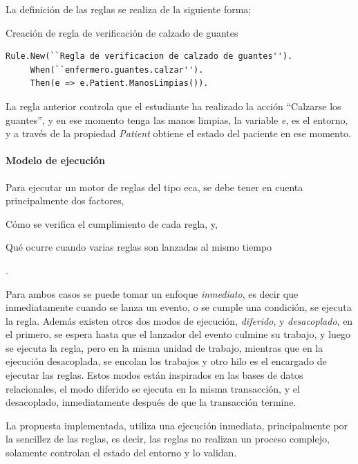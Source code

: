 La definición de las reglas se realiza de la siguiente forma;
\begin{algorithm}[H]
\caption{Creación de regla de verificación de calzado de guantes}
\label{alg:rule:guante}
\lstset{style=sharpc}
\begin{lstlisting}
Rule.New(``Regla de verificacion de calzado de guantes'').
     When(``enfermero.guantes.calzar'').
     Then(e => e.Patient.ManosLimpias()).
\end{lstlisting}
\end{algorithm}

La regla anterior controla que el estudiante ha realizado la acción ``Calzarse
los guantes'', y en ese momento tenga las manos limpias, la variable \emph{e},
es el entorno, y a través de la propiedad \emph{Patient} obtiene el estado del
paciente en ese momento.

\paragraph{Modelo de ejecución}

Para ejecutar un motor de reglas del tipo \gls{eca}, se debe tener en cuenta
principalmente dos factores, 
\begin{enumerate*}[label=\itshape\alph*\upshape)]
\item  Cómo se verifica el cumplimiento de cada regla, y, 
\item  Qué ocurre cuando varias reglas son lanzadas al mismo tiempo
\end{enumerate*}.

Para ambos casos se puede tomar un enfoque \emph{inmediato}, es decir que
inmediatamente cuando se lanza un evento, o se cumple una condición, se ejecuta
la regla. Además existen otros dos modos de ejecución, \emph{diferido}, y
\emph{desacoplado}, en el primero, se espera hasta que el lanzador del evento
culmine su trabajo, y luego se ejecuta la regla, pero en la misma unidad de
trabajo, mientras que en la ejecución desacoplada, se encolan los trabajos y
otro hilo es el encargado de ejecutar las reglas. Estos modos están inspirados
en las bases de datos relacionales, el modo diferido se ejecuta en la misma
transacción, y el desacoplado, inmediatamente después de que la transacción
termine\cite{bailey2004event}.

La propuesta implementada, utiliza una ejecución inmediata, principalmente por
la sencillez de las reglas, es decir, las reglas no realizan un proceso complejo,
solamente controlan el estado del entorno y lo validan.

